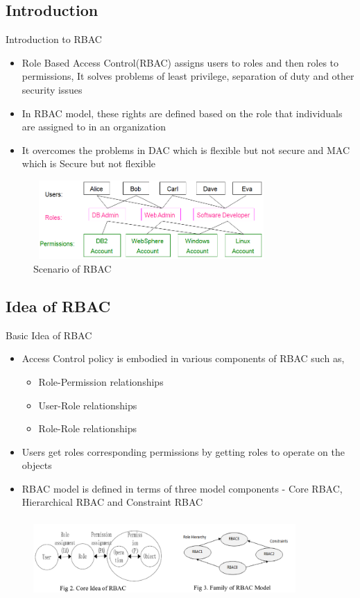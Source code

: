 \documentclass[10pt,xcolor=dvipsnames]{beamer}
\begin{document}
\subsection{Introduction}
\begin{frame}{Introduction to RBAC}
\begin{itemize}
 \item Role Based Access Control(RBAC) assigns users to roles and then roles to permissions, It solves problems of least privilege, separation of duty and other security issues
 \item In RBAC model, these rights are defined based on the role that individuals are assigned to in an organization
 \item It overcomes the problems in DAC which is flexible but not secure and MAC which is Secure but not flexible
\end{itemize}
\begin{figure}[H]
\includegraphics[width=9cm,height=3cm]{sunny1}
\caption{Scenario of RBAC\label{fig:Scenario of RBAC}}
\end{figure}
\end{frame}

\subsection{Idea of RBAC}
\begin{frame}{Basic Idea of RBAC}
\begin{itemize}
	\item  Access Control policy is embodied in various components of RBAC such as,
	\begin{itemize}
	\item Role-Permission relationships
	\item User-Role relationships
	\item Role-Role relationships
	\end{itemize}
	\item Users get roles corresponding permissions by getting roles to operate on the objects
	\item RBAC model is defined in terms of three model components - Core RBAC, Hierarchical RBAC and Constraint RBAC
\end{itemize}
\begin{figure}[H]
\includegraphics[width=10cm,height=3cm]{sunny2_r}
\end{figure}
\end{frame}
\end{document}
